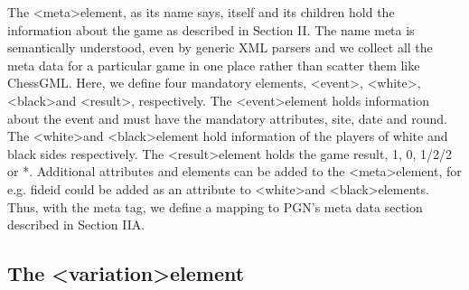\documentclass[conference]{IEEEtran}
\begin{document}
The \textless meta\textgreater  element, as its name says, itself and its children hold the information about the game as described in Section II. The name meta is semantically understood, even by generic XML parsers and we collect all the meta data for a particular game in one place rather than scatter them like ChessGML. Here, we define four mandatory elements, \textless event\textgreater , \textless white\textgreater , \textless black\textgreater  and \textless result\textgreater , respectively. The \textless event\textgreater  element holds information about the event and must have the mandatory attributes, site, date and round. The \textless white\textgreater  and \textless black\textgreater  element hold information of the players of white and black sides respectively. The \textless result\textgreater  element holds the game result, 1, 0, 1/2/2 or *. Additional attributes and elements can be added to the \textless meta\textgreater  element, for e.g. fideid could be added as an attribute to \textless white\textgreater  and \textless black\textgreater  elements. Thus, with the meta tag, we define a mapping to PGN's meta data section described in Section II\textendash A.




\subsection{The \textless variation\textgreater  element}
\end{document}
